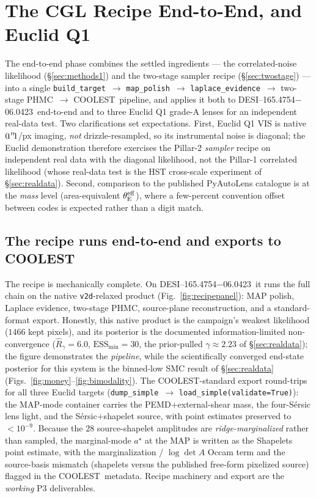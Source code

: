 \documentclass[11pt,letterpaper]{article}
\newcommand{\thetaE}{\ensuremath{\theta_{\mathrm{E}}}}
\newcommand{\gammaEPL}{\ensuremath{\gamma}}
\newcommand{\Rhat}{\ensuremath{\hat{R}}}
\newcommand{\ESS}{\textrm{ESS}}
\newcommand{\foundry}{DESI--165.4754$-$06.0423}
\newcommand{\coolest}{\textsc{COOLEST}}
\newcommand{\dfile}[1]{\texttt{#1}}
\begin{document}
\section{The CGL Recipe End-to-End, and Euclid Q1}
\label{sec:recipe}

The end-to-end phase combines the settled ingredients --- the correlated-noise
likelihood (\S\ref{sec:methods1}) and the two-stage sampler recipe
(\S\ref{sec:twostage}) --- into a single \dfile{build\_target}~$\to$
\dfile{map\_polish}~$\to$ \dfile{laplace\_evidence}~$\to$ two-stage
PHMC~$\to$ \coolest\ pipeline, and applies it both to \foundry\ end-to-end and
to three Euclid Q1 grade-A lenses \citep{euclidq1_slde_2025} for an independent
real-data test. Two clarifications set expectations. First, Euclid Q1 VIS is
native $0\mbox{$\!\!\,.{}^{\prime\prime}\!\!\,$}1$/px imaging, {\it not} drizzle-resampled, so its instrumental
noise is diagonal; the Euclid demonstration therefore exercises the Pillar-2
{\it sampler} recipe on independent real data with the diagonal likelihood, not
the Pillar-1 correlated likelihood (whose real-data test is the HST cross-scale
experiment of \S\ref{sec:realdata}). Second, comparison to the published
PyAutoLens catalogue is at the {\it mass} level (area-equivalent
$\thetaE^{\rm eff}$), where a few-percent convention offset between codes is
expected rather than a digit match.

\subsection{The recipe runs end-to-end and exports to \coolest}

The recipe is mechanically complete. On \foundry\ it runs the full chain on the
native \dfile{v2d}-relaxed product (Fig.~\ref{fig:recipepanel}): MAP polish,
Laplace evidence, two-stage PHMC, source-plane reconstruction, and a
standard-format export. Honestly, this native product is the campaign's weakest
likelihood ($1466$ kept pixels), and its posterior is the documented
information-limited non-convergence ($\Rhat_\gamma=6.0$, $\ESS_{\min}=30$, the
prior-pulled $\gammaEPL\approx2.23$ of \S\ref{sec:realdata}); the figure
demonstrates the {\it pipeline}, while the scientifically converged end-state
posterior for this system is the binned-low SMC result of \S\ref{sec:realdata}
(Figs.~\ref{fig:money}--\ref{fig:bimodality}). The \coolest-standard export
\citep{coolest2023} round-trips for all three Euclid targets
(\dfile{dump\_simple}~$\to$ \dfile{load\_simple(validate=True)}): the MAP-mode
container carries the PEMD$+$external-shear mass, the four-S\'ersic lens light,
and the S\'ersic$+$shapelet source, with point estimates preserved to
$<10^{-9}$. Because the $28$ source-shapelet amplitudes are {\it
ridge-marginalized} rather than sampled, the marginal-mode $a^{\star}$ at the MAP
is written as the Shapelets point estimate, with the marginalization / $\log\det
A$ Occam term and the source-basis mismatch (shapelets versus the published
free-form pixelized source) flagged in the \coolest\ metadata. Recipe machinery
and export are the {\it working} P3 deliverables.
\end{document}
